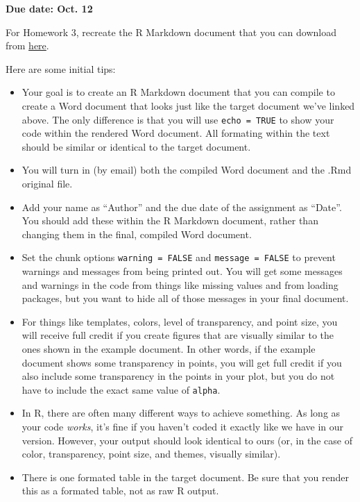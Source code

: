 \documentclass[]{book}
\providecommand{\tightlist}{%
  \setlength{\itemsep}{0pt}\setlength{\parskip}{0pt}}
\begin{document}
\textbf{Due date: Oct. 12}

For Homework 3, recreate the R Markdown document that you can download
from
\href{https://github.com/geanders/RProgrammingForResearch/raw/master/Homework/Homework_3.docx}{here}.

Here are some initial tips:

\begin{itemize}
\tightlist
\item
  Your goal is to create an R Markdown document that you can compile to
  create a Word document that looks just like the target document we've
  linked above. The only difference is that you will use
  \texttt{echo\ =\ TRUE} to show your code within the rendered Word
  document. All formating within the text should be similar or identical
  to the target document.\\
\item
  You will turn in (by email) both the compiled Word document and the
  .Rmd original file.
\item
  Add your name as ``Author'' and the due date of the assignment as
  ``Date''. You should add these within the R Markdown document, rather
  than changing them in the final, compiled Word document.
\item
  Set the chunk options \texttt{warning\ =\ FALSE} and
  \texttt{message\ =\ FALSE} to prevent warnings and messages from being
  printed out. You will get some messages and warnings in the code from
  things like missing values and from loading packages, but you want to
  hide all of those messages in your final document.
\item
  For things like templates, colors, level of transparency, and point
  size, you will receive full credit if you create figures that are
  visually similar to the ones shown in the example document. In other
  words, if the example document shows some transparency in points, you
  will get full credit if you also include some transparency in the
  points in your plot, but you do not have to include the exact same
  value of \texttt{alpha}.
\item
  In R, there are often many different ways to achieve something. As
  long as your code \emph{works}, it's fine if you haven't coded it
  exactly like we have in our version. However, your output should look
  identical to ours (or, in the case of color, transparency, point size,
  and themes, visually similar).
\item
  There is one formated table in the target document. Be sure that you
  render this as a formated table, not as raw R output.
\end{itemize}
\end{document}
